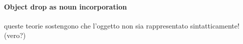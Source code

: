 
\paragraph{Object drop as noun incorporation}
queste teorie sostengono che l'oggetto non sia rappresentato sintatticamente! (vero?)


